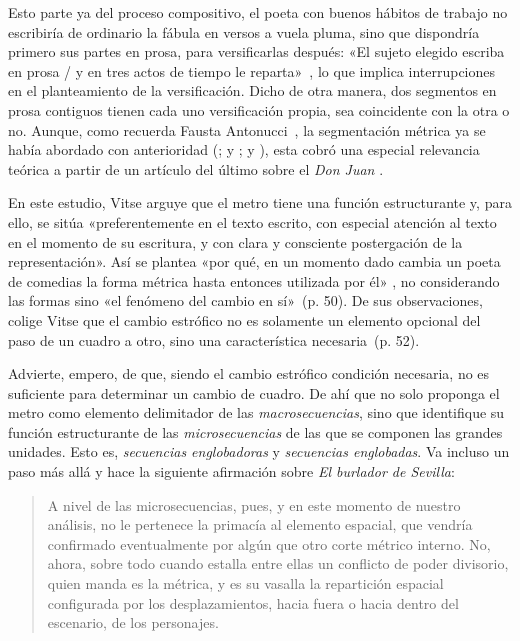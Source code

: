 Esto parte ya del proceso compositivo, el poeta con buenos hábitos de trabajo no escribiría de ordinario la fábula en versos a vuela pluma, sino que dispondría primero sus partes en prosa, para versificarlas después: «El sujeto elegido escriba en prosa / y en tres actos de tiempo le
reparta»~\parencite[211-212]{vega2006}, lo que implica interrupciones en el planteamiento de la versificación. Dicho de otra manera, dos segmentos en prosa contiguos tienen cada uno versificación propia, sea coincidente con la otra o no. Aunque, como recuerda Fausta Antonucci~\parencite*[78]{antonucci2010}, la segmentación métrica ya se había abordado con anterioridad (\cite{williamsen1978}; \cite{dixon1985} y \citeyear{dixon1994}; \cite{vitse1996} y \citeyear{vitse1988}), esta cobró una especial relevancia teórica a partir de un artículo del último sobre el \textit{Don Juan} \parencite{vitse1998}.

En este estudio, Vitse arguye que el metro tiene una función estructurante y, para ello, se sitúa «preferentemente en el texto escrito, con especial atención al
texto en el momento de su escritura, y con clara y consciente postergación de la representación». Así se plantea «por qué, en un momento dado cambia un poeta de comedias la forma métrica hasta entonces utilizada por él» \parencite*[49]{vitse1998}, no considerando las formas sino «el fenómeno del cambio en sí»~{(p. 50)}. De sus observaciones, colige Vitse que el cambio estrófico no es solamente un elemento opcional del paso de un cuadro a otro, sino una característica necesaria~{(p. 52)}.

Advierte, empero, de que, siendo el cambio estrófico condición necesaria, no es suficiente para determinar un cambio de cuadro. De ahí que no solo proponga el metro como elemento delimitador de las \textit{macrosecuencias}, sino que identifique su función estructurante de las \textit{microsecuencias} de las que se componen las grandes unidades. Esto es, \textit{secuencias englobadoras} y \textit{secuencias englobadas}. Va incluso un paso más allá y hace la siguiente afirmación sobre \textit{El burlador de Sevilla}:

\blockquote{A nivel de las microsecuencias, pues, y en este momento de nuestro análisis, no le pertenece la primacía al elemento espacial, que vendría confirmado eventualmente por algún que otro corte métrico interno. No, ahora, sobre todo cuando estalla entre ellas un conflicto de poder divisorio, quien manda es la métrica, y es su vasalla la repartición espacial configurada por los desplazamientos, hacia fuera o hacia dentro del escenario, de los personajes. \parencite[53]{vitse1998}}

